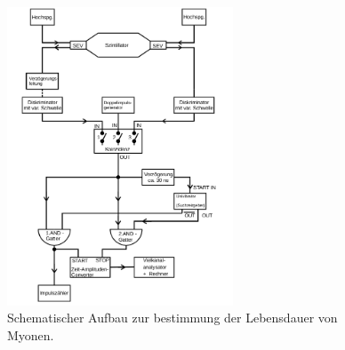 \begin{figure}
    \centering
    \includegraphics[width=0.6\textwidth]{bilder/aufbau.png}
    \caption{Schematischer Aufbau zur bestimmung der Lebensdauer von Myonen. \cite{skript}} 
    \label{fig:1}
\end{figure}